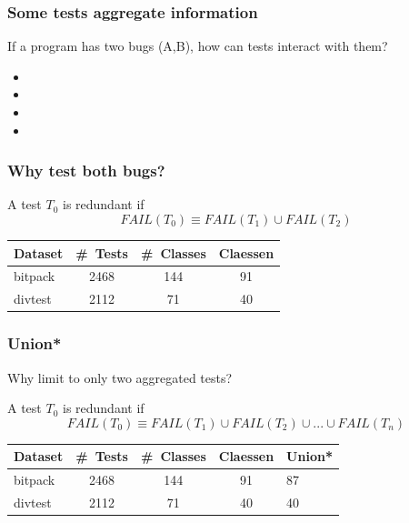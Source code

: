 \documentclass[svgnames,14pt]{beamer}
\newcommand\fail{\mathit{FAIL}}
\theoremstyle{definition}
\begin{document}
\begin{frame}
\frametitle{Some tests aggregate information}
If a program has two bugs (A,B), how can tests interact with them?
\begin{itemize}
\item {}
\item {}
\item {}
\item {}
\end{itemize}
\end{frame}

\begin{frame}
\frametitle{Why test both bugs?}
\begin{block}{}
A test $T_0$ is redundant if
$$\fail (T_0) \equiv \fail(T_1) \cup \fail(T_2)$$
\end{block}
\end{frame}

\begin{frame}
\def\?{\phantom0}
\begin{tabular}{ | l | c | c | c | }
\hline
Dataset & \#~Tests & \#\ Classes & Claessen\\ 
\hline
bitpack & 2468 & 144 & 91\\
divtest & 2112 & \?71 & 40\\
\hline
\end{tabular}
\end{frame}

\begin{frame}
\frametitle{Union*}
Why limit to only two aggregated tests?
\end{frame}
A test $T_0$ is redundant if
$$\fail (T_0) \equiv \fail(T_1) \cup \fail(T_2) \cup ... \cup \fail(T_n) $$
\begin{frame}
\begin{block}{}
\end{block}
\end{frame}

\begin{frame}
\def\?{\phantom0}
\begin{tabular}{ | l | c | c | c | }
\hline
Dataset & \#~Tests & \#\ Classes & Claessen & Union*\\ 
\hline
bitpack & 2468 & 144 & 91 & 87\\
divtest & 2112 & \?71 & 40 & 40\\
\hline
\end{tabular}
\end{frame}
\end{document}
